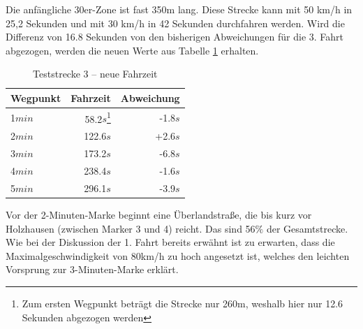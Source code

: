 Die anfängliche 30er-Zone ist fast 350m lang.
Diese Strecke kann mit 50 km/h in 25,2 Sekunden und mit 30 km/h in 42 Sekunden durchfahren werden.
Wird die Differenz von 16.8 Sekunden von den bisherigen Abweichungen für die 3. Fahrt abgezogen, werden die neuen Werte aus Tabelle \ref{tab:new3} erhalten.

\begin{table}[htb]
\centering
\caption{Teststrecke 3 -- neue Fahrzeit}
\label{tab:new3}
\begin{tabular}{|l|r|r|}
\hline
Wegpunkt & Fahrzeit & Abweichung \\ \hline 
1$min$ & 58.2$s$\footnote{Zum ersten Wegpunkt beträgt die Strecke nur 260m, weshalb hier nur 12.6 Sekunden abgezogen werden} & -1.8$s$  \\
2$min$ & 122.6$s$ & +2.6$s$  \\
3$min$ & 173.2$s$ & -6.8$s$  \\
4$min$ & 238.4$s$ & -1.6$s$  \\
5$min$ & 296.1$s$ & -3.9$s$  \\
\hline
\end{tabular}
\end{table}

Vor der 2-Minuten-Marke beginnt eine Überlandstraße, die bis kurz vor Holzhausen (zwischen Marker 3 und 4) reicht.
Das sind 56$\%$ der Gesamtstrecke.
Wie bei der Diskussion der 1. Fahrt bereits erwähnt ist zu erwarten, dass die Maximalgeschwindigkeit von 80km/h zu hoch angesetzt ist, welches den leichten Vorsprung zur 3-Minuten-Marke erklärt.


